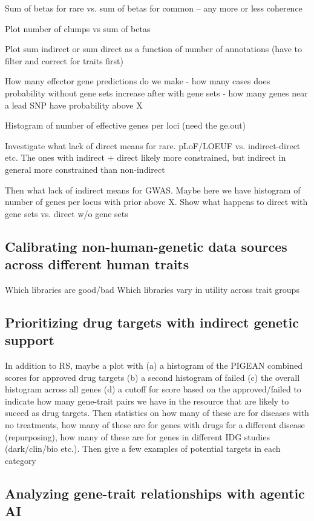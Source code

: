 \documentclass[sn-nature,lineno]{sn-jnl}%
\theoremstyle{thmstyleone}%
\theoremstyle{thmstyletwo}%
\theoremstyle{thmstylethree}%
\begin{document}
Sum of betas for rare vs. sum of betas for common -- any more or less coherence 

Plot number of clumps vs sum of betas

Plot sum indirect or sum direct as a function of number of annotations (have to filter and correct for traits first)

How many effector gene predictions do we make
 - how many cases does probability without gene sets increase after with gene sets
 - how many genes near a lead SNP have probability above X

 Histogram of number of effective genes per loci (need the ge.out)

Investigate what lack of direct means for rare. pLoF/LOEUF vs. indirect-direct etc. The ones with indirect + direct likely more constrained, but indirect in general more constrained than non-indirect

Then what lack of indirect means for GWAS. Maybe here we have histogram of number of genes per locus with prior above X. Show what happens to direct with gene sets vs. direct w/o gene sets

\subsection{Calibrating non-human-genetic data sources across different human traits}

Which libraries are good/bad
Which libraries vary in utility across trait groups


\subsection{Prioritizing drug targets with indirect genetic support}

In addition to RS, maybe a plot with (a) a histogram of the PIGEAN combined scores for approved drug targets (b) a second histogram of failed (c) the overall histogram across all genes (d) a cutoff for score based on the approved/failed to indicate how many gene-trait pairs we have in the resource that are likely to suceed as drug targets. Then statistics on how many of these are for diseases with no treatments, how many of these are for genes with drugs for a different disease (repurposing), how many of these are for genes in different IDG studies (dark/clin/bio etc.). Then give a few examples of potential targets in each category

\subsection{Analyzing gene-trait relationships with agentic AI}
\end{document}
